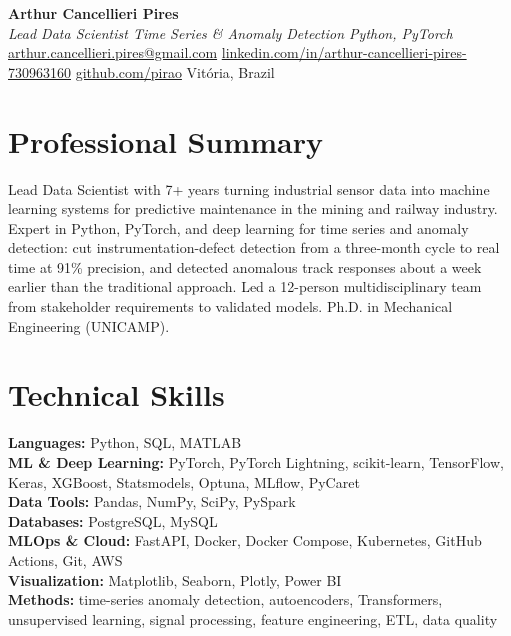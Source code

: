 \documentclass[a4paper,20pt]{article}
\begin{document}
\textbf{{\LARGE Arthur Cancellieri Pires}} \\ \vspace{2pt}
\textit{Lead Data Scientist \textbar{} Time Series \& Anomaly Detection \textbar{} Python, PyTorch} \\ \vspace{3pt}
{\small \href{mailto:arthur.cancellieri.pires@gmail.com}{arthur.cancellieri.pires@gmail.com}
 \textbar{} \href{https://www.linkedin.com/in/arthur-cancellieri-pires-730963160}{linkedin.com/in/arthur-cancellieri-pires-730963160}
 \textbar{} \href{https://github.com/pirao}{github.com/pirao}
 \textbar{} Vit\'oria, Brazil}

\vspace{-8pt}

\section{Professional Summary}
\vspace{1pt}
{\small\justifying Lead Data Scientist with 7+ years turning industrial sensor data into machine learning systems for predictive maintenance in the mining and railway industry. Expert in Python, PyTorch, and deep learning for time series and anomaly detection: cut instrumentation-defect detection from a three-month cycle to real time at 91\% precision, and detected anomalous track responses about a week earlier than the traditional approach. Led a 12-person multidisciplinary team from stakeholder requirements to validated models. Ph.D. in Mechanical Engineering (UNICAMP).\par}

\vspace{-6pt}

\section{Technical Skills}
\vspace{1pt}
{\small
\textbf{Languages:} Python, SQL, MATLAB \\
\textbf{ML \& Deep Learning:} PyTorch, PyTorch Lightning, scikit-learn, TensorFlow, Keras, XGBoost, Statsmodels, Optuna, MLflow, PyCaret \\
\textbf{Data Tools:} Pandas, NumPy, SciPy, PySpark \\
\textbf{Databases:} PostgreSQL, MySQL \\
\textbf{MLOps \& Cloud:} FastAPI, Docker, Docker Compose, Kubernetes, GitHub Actions, Git, AWS \\
\textbf{Visualization:} Matplotlib, Seaborn, Plotly, Power BI \\
\textbf{Methods:} time-series anomaly detection, autoencoders, Transformers, unsupervised learning, signal processing, feature engineering, ETL, data quality\par}
\end{document}
